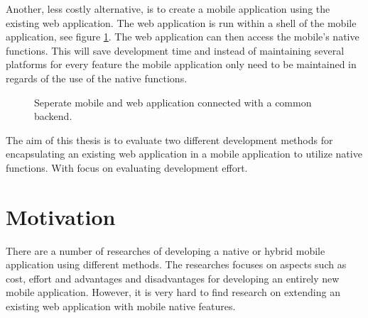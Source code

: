 Another, less costly alternative, is to create a mobile application using the existing web application. The web application is run within a shell of the mobile application, see figure \ref{figure-encapsulated-web}. The web application can then access the mobile’s native functions. This will save development time and instead of maintaining several platforms for every feature the mobile application only need to be maintained in regards of the use of the native functions. 

\begin{figure}\label{figure-encapsulated-web}
\centering
{} 
\medskip
\caption{Seperate mobile and web application connected with a common backend.} 
\end{figure}

The aim of this thesis is to evaluate two different development methods for encapsulating an existing web application in a mobile application to utilize native functions. With focus on evaluating development effort.

\section{Motivation}
There are a number of researches of developing a native or hybrid mobile application using different methods. The researches focuses on aspects such as cost, effort and advantages and disadvantages for developing an entirely new mobile application. However, it is very hard to find research on extending an existing web application with mobile native features. 

